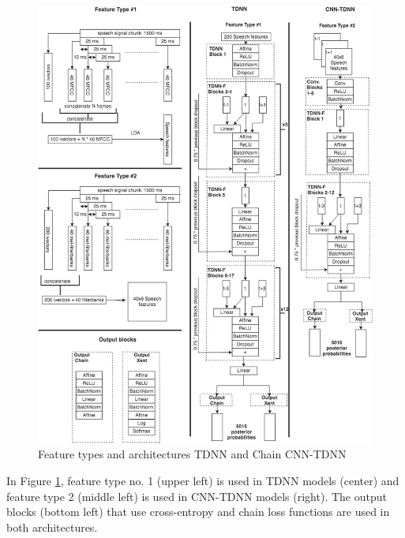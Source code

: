 \newpage
\begin{landscape}
  \begin{figure}[h]
    \centering
    \includegraphics[width=1.0\textwidth, angle=90]{img/TDNNvsCNNTDNN.png}
    \caption{Feature types and architectures TDNN and Chain CNN-TDNN \cite{georgescu_performance_2021}}
    \label{fig:CNNTDNNvsTDNNl}
  \end{figure}  
\end{landscape}
\newpage

In Figure \ref{fig:CNNTDNNvsTDNNl}, feature type no. 1 (upper left) is used in TDNN models (center) and feature type 2 (middle left) is used in CNN-TDNN models (right). The output blocks (bottom left) that use cross-entropy and chain loss functions are used in both architectures.



